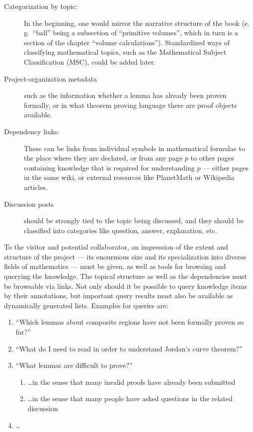 \documentclass{llncs}
\begin{document}
\begin{description}
\item[Categorization by topic:] In the beginning, one would mirror the narrative structure
  of the book (e.\,g.\ ``ball'' being a subsection of ``primitive volumes'', which in turn
  is a section of the chapter ``volume calculations'').  Standardized ways of classifying
  mathematical topics, such as the Mathematical Subject Classification
  (MSC), could be added later.
\item[Project-organization metadata] such as the information whether a lemma has already
  been proven formally, or in what theorem proving language there are proof objects
  available.
\item[Dependency links:] These can be links from individual symbols in mathematical
  formulae to the place where they are declared, or from any page $p$ to other pages
  containing knowledge that is required for understanding $p$ --- either pages in the same
  wiki, or external resources like PlanetMath or Wikipedia articles.
\item[Discussion posts] should be strongly tied to the topic being discussed, and they
  should be classified into categories like question, answer, explanation,
  etc.
\end{description}

To the visitor and potential collaborator, an impression of the extent and structure of
the project --- its enourmous size and its specialization into diverse fields of
mathematics --- must be given, as well as tools for browsing and querying the knowledge.
The topical structure as well as the dependencies must be browsable via links.  Not only
should it be possible to query knowledge items by their annotations, but important query
results must also be available as dynamically generated lists.  Examples for queries are:

\begin{enumerate}
\item\label{item:proven-lemma} ``Which lemmas about composite regions have not been
  formally proven so far?''
\item ``What do I need to read in order to understand Jordan's curve
  theorem?''
\item ``What lemmas are difficult to prove?''
  \begin{enumerate}
  \item \ldots in the sense that many invalid proofs have already been submitted
  \item\label{item:question-count} \ldots in the sense that many people have asked
    questions in the related discussion
  \end{enumerate}
\item \ldots{}
\end{enumerate}
\end{document}
